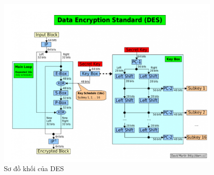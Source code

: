 \documentclass[a4paper]{article}
\begin{document}
\begin{figure}[htp]
    \centering
    \includegraphics[scale=0.8]{DES.png}
    \caption{Sơ đồ khối của DES}
    \label{fig:DES}
\end{figure}
\\
\end{document}
